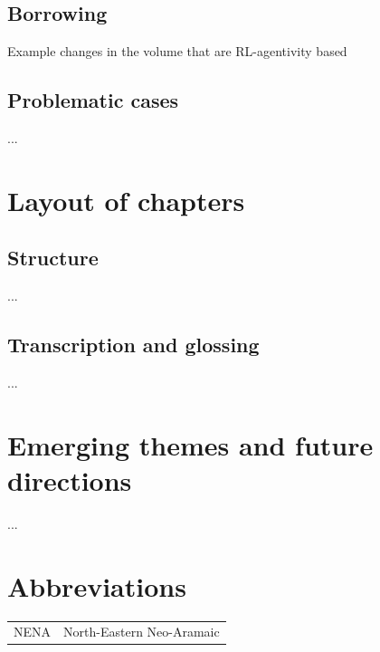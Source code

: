\documentclass[output=paper]{langsci/langscibook}
\begin{document}
\subsection{Borrowing}
Example changes in the volume that are RL-agentivity based

\subsection{Problematic cases}
...


\section{Layout of chapters}\label{introstructure}

\subsection{Structure}
...

\subsection{Transcription and glossing}
...


\section{Emerging themes and future directions}\label{introthemes}
...

\section*{Abbreviations}

\begin{tabularx}{.5\textwidth}{@{}lQ@{}}
NENA & North-Eastern Neo-Aramaic
\end{tabularx}%

\sloppy
\printbibliography[heading=subbibliography,notkeyword=this] 
\end{document}
